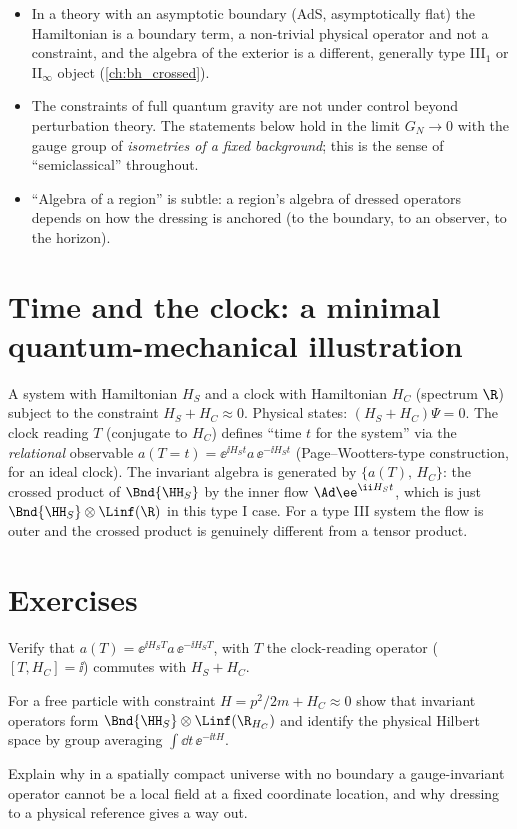 \begin{whatwrong}
\begin{itemize}
\item In a theory with an asymptotic boundary (AdS, asymptotically flat) the Hamiltonian is a boundary term, a non-trivial physical operator and not a constraint, and the algebra of the exterior is a different, generally type III$_1$ or II$_\infty$ object (\cref{ch:bh_crossed}).
\item The constraints of full quantum gravity are not under control beyond perturbation theory. The statements below hold in the limit $G_N\to0$ with the gauge group of \emph{isometries of a fixed background}; this is the sense of ``semiclassical'' throughout.
\item ``Algebra of a region'' is subtle: a region's algebra of dressed operators depends on how the dressing is anchored (to the boundary, to an observer, to the horizon).
\end{itemize}
\end{whatwrong}

\section{Time and the clock: a minimal quantum-mechanical illustration}

A system with Hamiltonian $H_S$ and a clock with Hamiltonian $H_C$ (spectrum $\R$) subject to the constraint $H_S+H_C\approx0$. Physical states: $(H_S+H_C)\Psi=0$. The clock reading $T$ (conjugate to $H_C$) defines ``time $t$ for the system'' via the \emph{relational} observable $a(T=t)=\ee^{\ii H_S t}a\,\ee^{-\ii H_St}$ (Page--Wootters-type construction, for an ideal clock). The invariant algebra is generated by $\{a(T),\,H_C\}$: the crossed product of $\Bnd{\HH_S}$ by the inner flow $\Ad\ee^{\ii H_St}$, which is just $\Bnd{\HH_S}\otimes\Linf(\R)$ in this type I case. For a type III system the flow is outer and the crossed product is genuinely different from a tensor product.

\section*{Exercises}
\begin{exercise}
Verify that $a(T)=\ee^{\ii H_ST}a\,\ee^{-\ii H_ST}$, with $T$ the clock-reading operator ($[T,H_C]=\ii$) commutes with $H_S+H_C$.
\end{exercise}
\begin{exercise}
For a free particle with constraint $H=p^2/2m+H_C\approx0$ show that invariant operators form $\Bnd{\HH_S}\otimes\Linf(\R_{H_C})$ and identify the physical Hilbert space by group averaging $\int\dd t\,\ee^{-\ii tH}$.
\end{exercise}
\begin{exercise}
Explain why in a spatially compact universe with no boundary a gauge-invariant operator cannot be a local field at a fixed coordinate location, and why dressing to a physical reference gives a way out.
\end{exercise}
